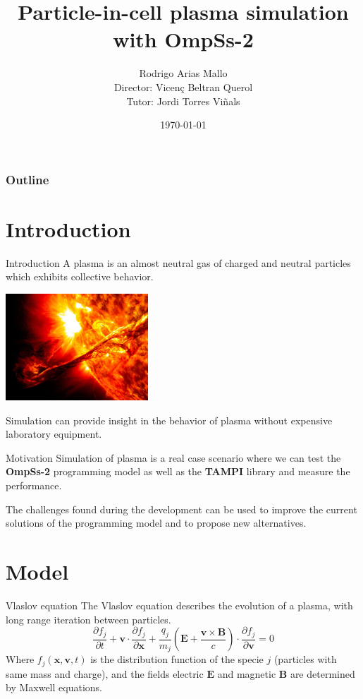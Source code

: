 \documentclass{beamer}
\title{Particle-in-cell plasma simulation\\with OmpSs-2}
\author{Rodrigo Arias Mallo\\
\vspace{1em}
{\footnotesize Director: Vicenç Beltran Querol \\
Tutor: Jordi Torres Viñals}}
\institute{Universitat Politècnica de Catalunya (UPC)}
\date{\today}
\newcommand*\V[1]{\bm{#1}}
\newcommand{\E}{\V{E}}
\newcommand{\B}{\V{B}}
\renewcommand*{\v}{\V{v}}
\newcommand{\x}{\V{x}}
\begin{document}
\frame{\titlepage}

\begin{frame}
\frametitle{Outline}
\tableofcontents
\end{frame}

\section{Introduction}

\begin{frame}{Introduction}
A plasma is an almost neutral gas of charged and neutral particles which 
exhibits collective behavior.

\begin{center}
\includegraphics[width=0.4\textwidth]{plasma.jpg}
\end{center}

Simulation can provide insight in the behavior of plasma without expensive 
laboratory equipment.
\end{frame}

\begin{frame}{Motivation}
Simulation of plasma is a real case scenario where we can test the 
\textbf{OmpSs-2} programming model as well as the \textbf{TAMPI} library and 
measure the performance.

\vspace{1em}
The challenges found during the development can be used to improve the current 
solutions of the programming model and to propose new alternatives.
\end{frame}




\section{Model}

\begin{frame}{Vlaslov equation}
The Vlaslov equation describes the evolution of a plasma, with long range 
iteration between particles.
\begin{equation}%
\frac {\partial f_j}{\partial t} +
\v \cdot \frac {\partial f_j}{\partial \V x } +
\frac{q_j}{m_j} \left( \E + \frac{\v \times \B}{c} \right) \cdot
	\frac {\partial f_j}{\partial \V v}
=0
\end{equation}%
Where $f_j(\x,\v,t)$ is the distribution function of the specie $j$ (particles 
with same mass and charge), and the fields electric $\E$ and magnetic $\B$ are 
determined by Maxwell equations.
\end{frame}
\end{document}
